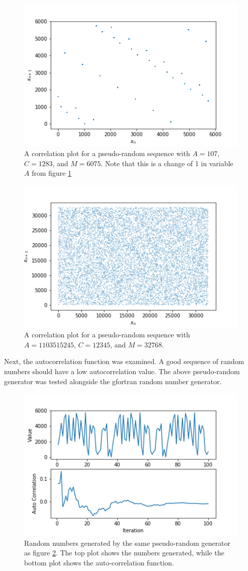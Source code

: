 \documentclass[twocolumn]{article}
\begin{document}
\begin{figure}
	\centering
	\includegraphics[width=0.7\linewidth]{fig2}
	\caption{A correlation plot for a pseudo-random sequence with $A=107$, $C=1283$, and $M=6075$. Note that this is a change of 1 in variable $A$ from figure \ref{fig:fig2}}
	\label{fig:fig2}
\end{figure}

\begin{figure}
	\centering
	\includegraphics[width=0.7\linewidth]{fig3}
	\caption{A correlation plot for a pseudo-random sequence with $A=1103515245$, $C=12345$, and $M=32768$.}
	\label{fig:fig3}
\end{figure}

Next, the autocorrelation function was examined. A good sequence of random numbers should have a low autocorrelation value. The above pseudo-random generator was tested alongside the gfortran random number generator.

\begin{figure}
\centering
\includegraphics[width=0.7\linewidth]{fig4}
\caption{Random numbers generated by the same pseudo-random generator as figure \ref{fig:fig3}. The top plot shows the numbers generated, while the bottom plot shows the auto-correlation function.}
\label{fig:fig4}
\end{figure}
\end{document}
